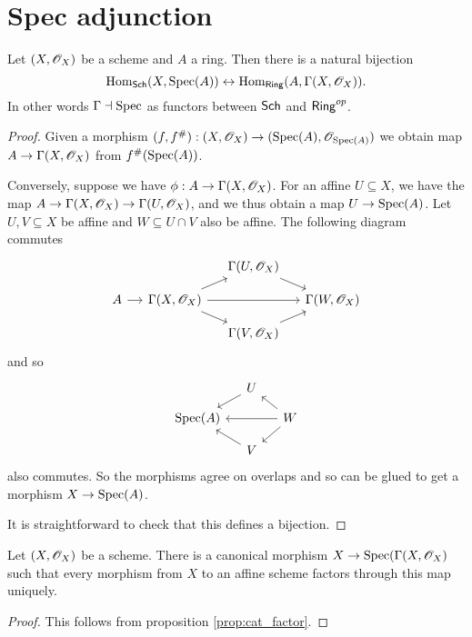 \documentclass{memoir}
\begin{document}
\section{Spec adjunction}
\begin{thm}
    Let $(X,\mathscr{O}_X)$ be a scheme and $A$ a ring. 
    Then there is a natural bijection
    \begin{equation}
        \operatorname{Hom}_{\normalfont\mathsf{Sch}}(X,\operatorname{Spec}(A)) \leftrightarrow \operatorname{Hom}_{\normalfont\mathsf{Ring}}(A,\Gamma(X,\mathscr{O}_X)).
    \end{equation}
    In other words $\Gamma \dashv \operatorname{Spec}$ as functors between ${\normalfont\mathsf{Sch}}$ and ${\normalfont\mathsf{Ring}}^{op}$.
\end{thm}
\begin{proof}
    Given a morphism $(f,f^\#):(X,\mathscr{O}_X) \to (\operatorname{Spec}(A),\mathscr{O}_{\operatorname{Spec}(A)})$ we obtain map $A\to \Gamma(X,\mathscr{O}_X)$ from $f^\#(\operatorname{Spec}(A))$.

    Conversely, suppose we have $\phi:A\to \Gamma(X,\mathscr{O}_X)$.
    For an affine $U\subseteq X$, we have the map $A\to \Gamma(X,\mathscr{O}_X) \to \Gamma(U,\mathscr{O}_X)$, and we thus obtain a map $U\to \operatorname{Spec}(A)$.
    Let $U,V\subseteq X$ be affine and $W\subseteq U\cap V$ also be affine.
    The following diagram commutes
    \begin{equation}
        \begin{tikzcd}[column sep=small,row sep=small]
            & & \Gamma(U,\shf{O}_X) \arrow[dr] & \\
            A \arrow[r] & \Gamma(X,\shf{O}_X) \arrow[ur] \arrow[dr] \arrow[rr] & & \Gamma(W,\shf{O}_X) \\
                        & & \Gamma(V,\shf{O}_X) \arrow[ur] &
        \end{tikzcd}
    \end{equation}
    and so 
    \begin{equation}
        \begin{tikzcd}[column sep=small,row sep=small]
                     & U \arrow[dl] & \\
            \Spec(A) & & W \arrow[dl] \arrow[ul] \arrow[ll] \\
                     & V \arrow[ul] &
        \end{tikzcd}
    \end{equation}
    also commutes.
    So the morphisms agree on overlaps and so can be glued to get a morphism $X\to \operatorname{Spec}(A)$.

    It is straightforward to check that this defines a bijection.
\end{proof}
\begin{corollary}
    Let $(X,\mathscr{O}_X)$ be a scheme. 
    There is a canonical morphism $X\to \operatorname{Spec}(\Gamma(X,\mathscr{O}_X)$ such that every morphism from $X$ to an affine scheme factors through this map uniquely.
\end{corollary}
\begin{proof}
    This follows from proposition \ref{prop:cat_factor}.
\end{proof}
\end{document}
